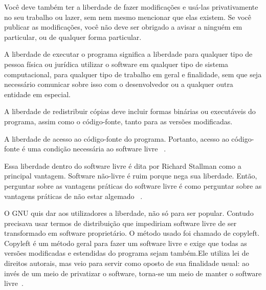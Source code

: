 Você deve também ter a liberdade de fazer modificações e usá-las privativamente no seu trabalho ou lazer, sem nem mesmo mencionar que elas existem. Se você publicar as modificações, você não deve ser obrigado a avisar a ninguém em particular, ou de qualquer forma particular.

A liberdade de executar o programa significa a liberdade para qualquer tipo de pessoa física ou jurídica utilizar o software em qualquer tipo de sistema computacional, para qualquer tipo de trabalho em geral e finalidade, sem que seja necessário comunicar sobre isso com o desenvolvedor ou a qualquer outra entidade em especial.

A liberdade de redistribuir cópias deve incluir formas binárias ou executáveis do programa, assim como o código-fonte, tanto para as versões modificadas.

A liberdade de acesso ao código-fonte do programa. Portanto, acesso ao código-fonte é uma condição necessária ao software livre ~\cite{gnu2013}.

%
Essa liberdade dentro do software livre é dita por Richard Stallman como a principal vantagem. Software não-livre é ruim porque nega sua liberdade. Então, perguntar sobre as vantagens práticas do software livre é como perguntar sobre as vantagens práticas de não estar algemado ~\cite{stallman2009}.

%
O GNU quis dar aos utilizadores a liberdade, não só para ser popular. Contudo precisava usar termos de distribuição que impediriam software livre de ser transformado em software proprietário. O método usado foi chamado de copyleft. Copyleft é um método geral para fazer um software livre e exige que todas as versões modificadas e estendidas do programa sejam também.Ele utiliza lei de direitos autorais, mas veio para servir como oposto de sua finalidade usual: ao invés de um meio de privatizar o software, torna-se um meio de manter o software livre~\cite{stallman2009}.

